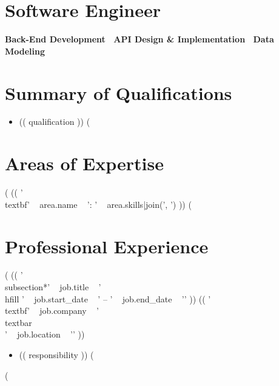 \documentclass[a4paper,10pt]{article}
\begin{document}
\begin{center}
\end{center}

\section*{Software Engineer}
\begin{center}
\textbf{Back-End Development \textbar\ API Design \& Implementation \textbar\ Data Modeling}
\end{center}

\section*{Summary of Qualifications}
\begin{itemize}[itemsep=0em]
(%
    \item (( qualification )) 
(%
\end{itemize}

\section*{Areas of Expertise}
\begin{minipage}{\textwidth}
\raggedright
(%
    (( '\\textbf{' ~ area.name ~ ':} ' ~ area.skills|join(', ') ))
(%
\end{minipage}

\section*{Professional Experience}
(%
    (( '\\subsection*{' ~ job.title ~ '\\hfill ' ~ job.start_date ~ ' -- ' ~ job.end_date ~ '}' ))
(( '\\textbf{' ~ job.company ~ ' \\textbar\\ ' ~ job.location ~ '}' ))
\begin{itemize}[itemsep=0em]
  (%
  \item (( responsibility ))
  (%
\end{itemize}
(%
\end{document}
